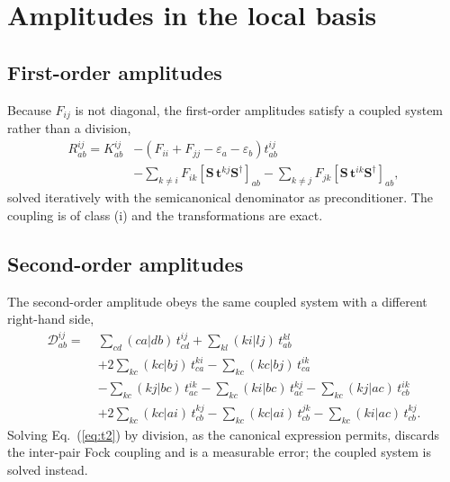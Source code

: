 \documentclass[aip,jcp,amsmath,amssymb,preprint,superscriptaddress]{revtex4-2}%
\begin{document}
\section{Amplitudes in the local basis}
\label{sec:amplitudes}

\subsection{First-order amplitudes}

Because $F_{ij}$ is not diagonal, the first-order amplitudes satisfy a coupled
system rather than a division,
%
\begin{align}
  R^{ij}_{ab} = K^{ij}_{ab}
    &- \left(F_{ii}+F_{jj}-\varepsilon_a-\varepsilon_b\right) t^{ij}_{ab}
      \nonumber\\
    &- \sum_{k \ne i} F_{ik}
        \left[\mathbf{S}\,\mathbf{t}^{kj}\mathbf{S}^{\dagger}\right]_{ab}
      - \sum_{k \ne j} F_{jk}
        \left[\mathbf{S}\,\mathbf{t}^{ik}\mathbf{S}^{\dagger}\right]_{ab},
  \label{eq:lmp2}
\end{align}
%
solved iteratively with the semicanonical denominator as preconditioner. The
coupling is of class (i) and the transformations are exact.

\subsection{Second-order amplitudes}

The second-order amplitude obeys the same coupled system with a different
right-hand side,
%
\begin{align}
  \mathcal{D}^{ij}_{ab} =\;
    &\sum_{cd}(ca|db)\,t^{ij}_{cd}
     + \sum_{kl}(ki|lj)\,t^{kl}_{ab} \nonumber\\
    &+ 2\sum_{kc}(kc|bj)\,t^{ki}_{ca}
     - \sum_{kc}(kc|bj)\,t^{ik}_{ca} \nonumber\\
    &- \sum_{kc}(kj|bc)\,t^{ik}_{ac}
     - \sum_{kc}(ki|bc)\,t^{kj}_{ac}
     - \sum_{kc}(kj|ac)\,t^{ik}_{cb} \nonumber\\
    &+ 2\sum_{kc}(kc|ai)\,t^{kj}_{cb}
     - \sum_{kc}(kc|ai)\,t^{jk}_{cb}
     - \sum_{kc}(ki|ac)\,t^{kj}_{cb}.
  \label{eq:t2}
\end{align}
%
Solving Eq.~(\ref{eq:t2}) by division, as the canonical expression permits,
discards the inter-pair Fock coupling and is a measurable error; the coupled
system is solved instead.
\end{document}
